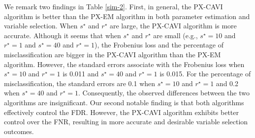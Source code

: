\documentclass[pdftex, noinfoline, letter]{imsart}
\theoremstyle{plain}
\begin{document}
We remark two findings in Table \ref{sim-2}. First, in general, the PX-CAVI algorithm is better than the PX-EM algorithm in both parameter estimation and variable selection. When $s^\star$ and $r^\star$ are large, the PX-CAVI algorithm is more accurate. Although it seems that when $s^\star$ and $r^\star$ are small (e.g., $s^\star = 10$ and $r^\star = 1$ and $s^\star = 40$ and $r^\star = 1$), the Frobenius loss and the percentage of misclassification are bigger in the PX-CAVI algorithm than the PX-EM algorithm. However, the standard errors associate with the Frobenius loss when $s^\star = 10$ and $r^\star = 1$ is 0.011 and $s^\star = 40$ and $r^\star = 1$ is 0.015. For the percentage of misclassification, the standard errors are 0.1 when $s^\star = 10$ and $r^\star = 1$ and 0.2 when $s^\star = 40$ and $r^\star = 1$. Consequently, the observed differences between the two algorithms are insignificant. Our second notable finding is that both algorithms effectively control the FDR. However, the PX-CAVI algorithm exhibits better control over the FNR, resulting in more accurate and desirable variable selection outcomes.
\end{document}
